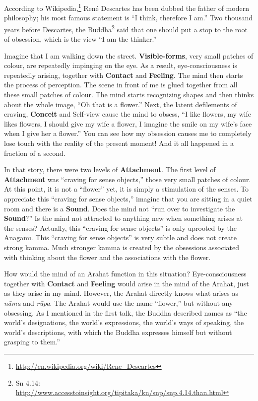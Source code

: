 According to Wikipedia,\footnote{\url{http://en.wikipedia.org/wiki/Rene_Descartes}} René Descartes has been dubbed the father of modern philosophy; his most famous statement is “I think, therefore I am.” Two thousand years before Descartes, the Buddha\footnote{Sn 4.14: \url{http://www.accesstoinsight.org/tipitaka/kn/snp/snp.4.14.than.html}} said that one should put a stop to the root of obsession, which is the view “I am the thinker.”

Imagine that I am walking down the street. \textbf{Visible-forms}, very small patches of colour, are repeatedly impinging on the eye. As a result, eye-consciousness is repeatedly arising, together with \textbf{Contact} and \textbf{Feeling}. The mind then starts the process of perception. The scene in front of me is glued together from all these small patches of colour. The mind starts recognizing shapes and then thinks about the whole image, “Oh that is a flower.” Next, the latent defilements of craving, \textbf{Conceit} and Self-view cause the mind to obsess, “I like flowers, my wife likes flowers, I should give my wife a flower, I imagine the smile on my wife’s face when I give her a flower.” You can see how my obsession causes me to completely lose touch with the reality of the present moment! And it all happened in a fraction of a second.

In that story, there were two levels of \textbf{Attachment}. The first level of \textbf{Attachment} was “craving for sense objects,” those very small patches of colour. At this point, it is not a “flower” yet, it is simply a stimulation of the senses. To appreciate this “craving for sense objects,” imagine that you are sitting in a quiet room and there is a \textbf{Sound}. Does the mind not “run over to investigate the \textbf{Sound}?” Is the mind not attracted to anything new when something arises at the senses? Actually, this “craving for sense objects” is only uprooted by the Anāgāmī. This “craving for sense objects” is very subtle and does not create strong kamma. Much stronger kamma is created by the obsessions associated with thinking about the flower and the associations with the flower.

How would the mind of an Arahat function in this situation? Eye-consciousness together with \textbf{Contact} and \textbf{Feeling} would arise in the mind of the Arahat, just as they arise in my mind. However, the Arahat directly knows what arises as \textit{nāma} and \textit{rūpa}. The Arahat would use the name “flower,” but without any obsessing. As I mentioned in the first talk, the Buddha described names as “the world’s designations, the world’s expressions, the world’s ways of speaking, the world’s descriptions, with which the Buddha expresses himself but without grasping to them.”

